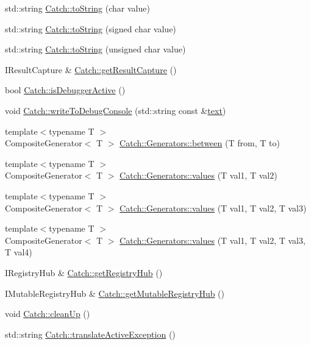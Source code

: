 \begin{DoxyCompactItemize}
\item 
std\+::string \hyperlink{a00117_a25a0a78cbb62ea08b5d49e443051c387}{Catch\+::to\+String} (char value)
\item 
std\+::string \hyperlink{a00117_a0a5d9d0965d0d2a0663773732283713e}{Catch\+::to\+String} (signed char value)
\item 
std\+::string \hyperlink{a00117_a5d83eaeb68579a556c86cc05f7a7765f}{Catch\+::to\+String} (unsigned char value)
\item 
I\+Result\+Capture \& \hyperlink{a00117_aff60c1de6ac6cea30175d70e33d83c8e}{Catch\+::get\+Result\+Capture} ()
\item 
bool \hyperlink{a00117_ab079497368fb1df25af39ad494d2a241}{Catch\+::is\+Debugger\+Active} ()
\item 
void \hyperlink{a00117_aa5dcf4750ce9a854f4b74d3c952d13cc}{Catch\+::write\+To\+Debug\+Console} (std\+::string const \&\hyperlink{a00114_ac3ed6ea030e1a1d6234b110347cad11e}{text})
\item 
{\footnotesize template$<$typename T $>$ }\\Composite\+Generator$<$ T $>$ \hyperlink{a00119_a030abfa7ee3c58d909cf6a6aa0405265}{Catch\+::\+Generators\+::between} (T from, T to)
\item 
{\footnotesize template$<$typename T $>$ }\\Composite\+Generator$<$ T $>$ \hyperlink{a00119_a7a2c5bebb3c06c5b0ca05a80289b9eb1}{Catch\+::\+Generators\+::values} (T val1, T val2)
\item 
{\footnotesize template$<$typename T $>$ }\\Composite\+Generator$<$ T $>$ \hyperlink{a00119_a496c4a826107e47203b6c609cfd8c2c5}{Catch\+::\+Generators\+::values} (T val1, T val2, T val3)
\item 
{\footnotesize template$<$typename T $>$ }\\Composite\+Generator$<$ T $>$ \hyperlink{a00119_afb1dcf02bfc8cdf990f27fdc7d7e4a4e}{Catch\+::\+Generators\+::values} (T val1, T val2, T val3, T val4)
\item 
I\+Registry\+Hub \& \hyperlink{a00117_ac24b072979540bfd922e7d46e899f46f}{Catch\+::get\+Registry\+Hub} ()
\item 
I\+Mutable\+Registry\+Hub \& \hyperlink{a00117_ac9ddcc6d66079add9cb2a3140b8ae51e}{Catch\+::get\+Mutable\+Registry\+Hub} ()
\item 
void \hyperlink{a00117_a0f78e9afdebc6d4512d18e76fbf54b8c}{Catch\+::clean\+Up} ()
\item 
std\+::string \hyperlink{a00117_adafff91485eeeeb9e9333f317cc0e3b1}{Catch\+::translate\+Active\+Exception} ()

\end{DoxyCompactItemize}
